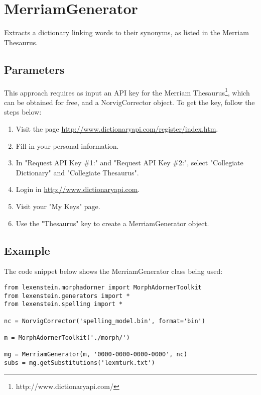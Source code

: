 \section{MerriamGenerator}

Extracts a dictionary linking words to their synonyms, as listed in the Merriam Thesaurus.

\subsection{Parameters}

This approach requires as input an API key for the Merriam Thesaurus\footnote{http://www.dictionaryapi.com/}, which can be obtained for free, and a NorvigCorrector object. To get the key, follow the steps below:

\begin{enumerate}
\item Visit the page \url{http://www.dictionaryapi.com/register/index.htm}.
\item Fill in your personal information.
\item In "Request API Key \#1:" and "Request API Key \#2:", select "Collegiate Dictionary" and "Collegiate Thesaurus".
\item Login in \url{http://www.dictionaryapi.com}.
\item Visit your "My Keys" page.
\item Use the "Thesaurus" key to create a MerriamGenerator object.
\end{enumerate}

\subsection{Example}

The code snippet below shows the MerriamGenerator class being used:

\begin{lstlisting}
from lexenstein.morphadorner import MorphAdornerToolkit
from lexenstein.generators import *
from lexenstein.spelling import *

nc = NorvigCorrector('spelling_model.bin', format='bin')

m = MorphAdornerToolkit('./morph/')

mg = MerriamGenerator(m, '0000-0000-0000-0000', nc)
subs = mg.getSubstitutions('lexmturk.txt')
\end{lstlisting}















